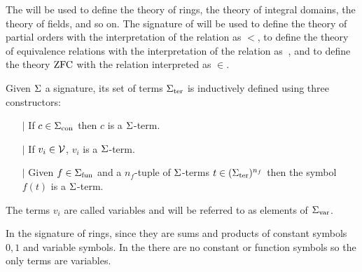 \begin{eg}
    The  
    will be used to define the theory of rings, 
    the theory of integral domains, the theory of fields, and so on.
    The signature of  
    will be used to define the theory of partial orders
    with the interpretation of the relation as $<$, 
    to define the theory of equivalence relations with the 
    interpretation of the relation as $~$,
    and to define the theory $\operatorname{ZFC}$ with the relation interpreted as $\in$.
\end{eg}

\begin{dfn}[$\Si$-terms]
    Given $\Si$ a signature, its set of terms
    ${\Sigma}_\mathrm{ter}$ is inductively defined using three constructors:
    \begin{itemize}
        \item[$\vert$] If $c \in {\Sigma}_\mathrm{con}$
            then $c$ is a $\Si$-term.
        \item[$\vert$] If $v_i \in \mathcal{V}$, 
            $v_i$ is a $\Si$-term.
        \item[$\vert$] Given $f \in {\Sigma}_\mathrm{fun}$ and a $n_f$-tuple of $\Si$-terms
            $t \in ({\Sigma}_\mathrm{ter})^{n_f}$
            then the symbol $f(t)$ is a $\Si$-term.
    \end{itemize}
    The terms $v_i$ are called variables and will be 
    referred to as elements of ${\Sigma}_\mathrm{var}$.
\end{dfn}

\begin{eg}
    In the signature of rings, 
    since they are sums and products of constant symbols $0, 1$ and 
    variable symbols.
    In the  
    there are no constant or function symbols so the only terms are variables.
\end{eg}


